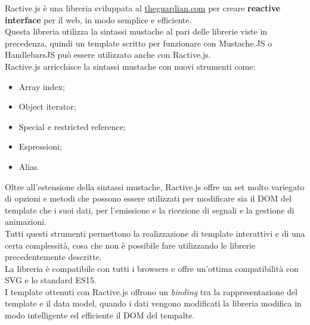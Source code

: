 Ractive.js è una libreria sviluppata al \href{https://www.theguardian.com}{theguardian.com} per creare \textbf{reactive interface} per il web, in modo semplice e efficiente.\\
Questa libreria utilizza la sintassi mustache al pari delle librerie viste in precedenza, quindi un template scritto per funzionare con Mustache.JS o HandlebarsJS può essere utilizzato anche con Ractive.js.\\
Ractive.js arricchisce la sintassi mustache con nuovi strumenti come:
\begin{itemize}
	\item Array index;
	\item Object iterator;
	\item Special e restricted reference;
	\item Espressioni;
	\item Alias.
\end{itemize}
Oltre all'estensione della sintassi mustache, Ractive.js offre un set molto variegato di opzioni e metodi che possono essere utilizzati per modificare sia il DOM del template che i suoi dati,  per l'emissione e la ricezione di segnali e la gestione di animazioni.\\
Tutti questi strumenti permettono la realizzazione di template interattivi e di una certa complessità, cosa che non è possibile fare utilizzando le librerie precedentemente descritte.\\
La libreria è compatibile con tutti i browsers e offre un'ottima compatibilità con SVG e lo standard ES15.\\
I template ottenuti con Ractive.js  offrono un \textit{binding} tra la rappresentazione del template e  il data model, quando i dati vengono modificati la libreria modifica in modo intelligente ed efficiente il DOM del tempalte.

